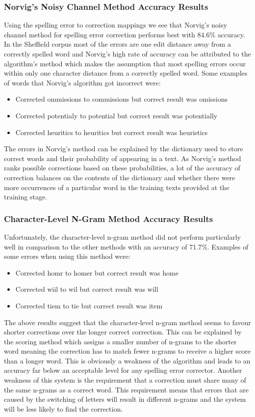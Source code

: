 \subsubsection*{Norvig's Noisy Channel Method Accuracy Results}
Using the spelling error to correction mappings we see that Norvig's noisy channel method for spelling error correction performs best with 84.6\% accuracy. In the Sheffield corpus most of the errors are one edit distance away from a correctly spelled word and Norvig's high rate of accuracy can be attributed to the algorithm's method which makes the assumption that most spelling errors occur within only one character distance from a correctly spelled word. Some examples of words that Norvig's algorithm got incorrect were:
\begin{itemize}
\item Corrected ommissions to commissions but correct result was omissions
\item Corrected potentialy to potential but correct result was potentially
\item Corrected heuritics to heuritics but correct result was heuristics
\end{itemize}
The errors in Norvig's method can be explained by the dictionary used to store correct words and their probability of appearing in a text. As Norvig's method ranks possible corrections based on these probabilities, a lot of the accuracy of correction balances on the contents of the dictionary and whether there were more occurrences of a particular word in the training texts provided at the training stage.

\subsubsection*{Character-Level N-Gram Method Accuracy Results}
Unfortunately, the character-level n-gram method did not perform particularly well in comparison to the other methods with an accuracy of 71.7\%. Examples of some errors when using this method were:
\begin{itemize}
\item Corrected homr to homer but correct result was home
\item Corrected wiil to wil but correct result was will
\item Corrected tiem to tie but correct result was item
\end{itemize}
The above results suggest that the character-level n-gram method seems to favour shorter corrections over the longer correct correction. This can be explained by the scoring method which assigns a smaller number of n-grams to the shorter word meaning the correction has to match fewer n-grams to receive a higher score than a longer word. This is obviously a weakness of the algorithm and leads to an accuracy far below an acceptable level for any spelling error corrector. Another weakness of this system is the requirement that a correction must share many of the same n-grams as a correct word. This requirement means that errors that are caused by the switching of letters will result in different n-grams and the system will be less likely to find the correction.


